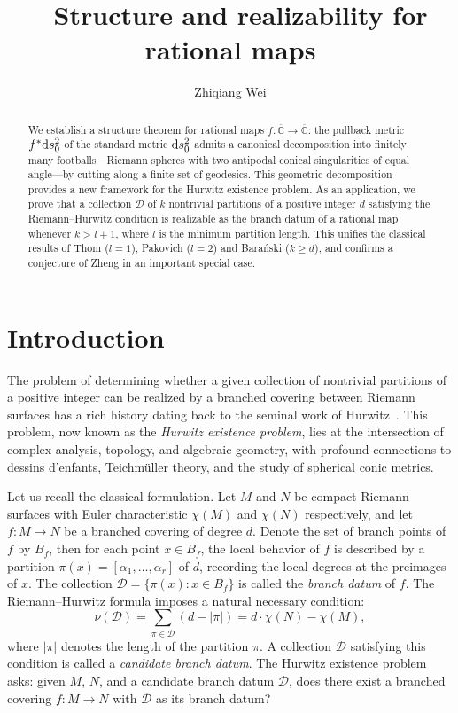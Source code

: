 \documentclass[microtype]{gtpart}     %
\title{$\ \ $ Structure and realizability for rational maps}
\author{Zhiqiang Wei}
\theoremstyle{definition}
\begin{document}
\begin{abstract}    %
We establish a structure theorem for rational maps $f:\overline{\mathbb{C}}\to\overline{\mathbb{C}}$: the pullback metric
$f^{*}{\rm d}s_{0}^{2}$ of the standard metric ${\rm d}s_{0}^{2}$ admits a canonical decomposition into finitely many footballs---Riemann
spheres with two antipodal conical singularities of equal angle---by cutting
along a finite set of geodesics. This geometric decomposition provides a new
framework for the Hurwitz existence problem. As an application, we prove that a collection $\mathcal{D}$ of $k$ nontrivial partitions of a positive integer $d$ satisfying the Riemann--Hurwitz condition is realizable  as the branch datum of a rational map whenever $k>l+1$, where $l$ is the minimum partition length. This unifies the classical
results of Thom ($l = 1$), Pakovich ($l = 2$) and Bara\'{n}ski ($k\geq d$), and confirms a conjecture of
Zheng in an important special case.
\end{abstract}

\maketitle


\section{Introduction}

The problem of determining whether a given collection of nontrivial partitions of a positive integer can be realized by a branched covering between Riemann surfaces has a rich history dating back to the seminal work of Hurwitz~\cite{Hur91}. This problem, now known as the \emph{Hurwitz existence problem}, lies at the intersection of complex analysis, topology, and algebraic geometry, with profound connections to dessins d'enfants, Teichm\"uller theory, and the study of spherical conic metrics.

Let us recall the classical formulation. Let $M$ and $N$ be compact Riemann surfaces with Euler characteristic $\chi(M)$ and $\chi(N)$ respectively, and let $f: M \to N$ be a branched covering of degree $d$. Denote the set of branch points of $f$ by $B_f$, then for each  point $x \in B_f$, the local behavior of $f$ is described by a partition $\pi(x) = [\alpha_1,\ldots,\alpha_r]$ of $d$, recording the local degrees at the preimages of $x$.  The collection $\mathcal{D} = \{\pi(x) : x \in B_f\}$ is called the \emph{branch datum} of $f$. The Riemann--Hurwitz formula imposes a natural necessary condition:
\[
\nu(\mathcal{D}) = \sum_{\pi \in \mathcal{D}} (d - |\pi|) = d \cdot \chi(N) - \chi(M),
\]
where $|\pi|$ denotes the length of the partition $\pi$. A collection $\mathcal{D}$ satisfying this condition is called a \emph{candidate branch datum}. The Hurwitz existence problem asks: given $M$, $N$, and a candidate branch datum $\mathcal{D}$, does there exist a branched covering $f: M \to N$ with $\mathcal{D}$ as its  branch datum?
\end{document}
